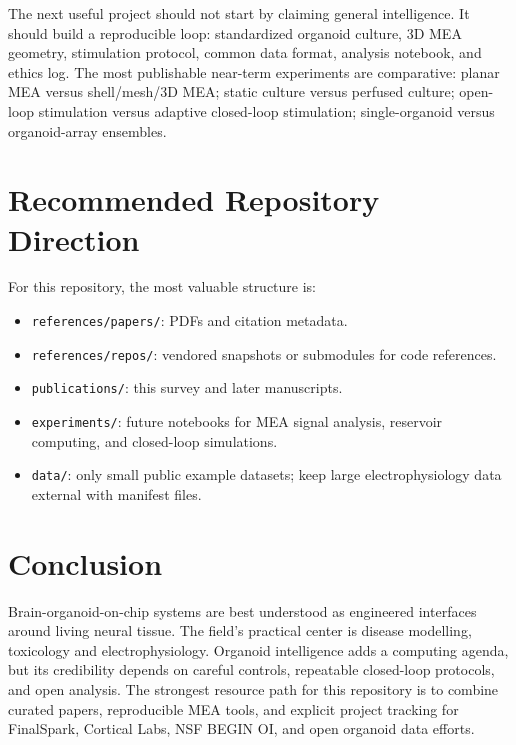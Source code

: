 \documentclass[10pt,twocolumn]{article}
\begin{document}
The next useful project should not start by claiming general intelligence. It should build a reproducible loop: standardized organoid culture, 3D MEA geometry, stimulation protocol, common data format, analysis notebook, and ethics log. The most publishable near-term experiments are comparative: planar MEA versus shell/mesh/3D MEA; static culture versus perfused culture; open-loop stimulation versus adaptive closed-loop stimulation; single-organoid versus organoid-array ensembles.

\section{Recommended Repository Direction}

For this repository, the most valuable structure is:
\begin{itemize}
\item \texttt{references/papers/}: PDFs and citation metadata.
\item \texttt{references/repos/}: vendored snapshots or submodules for code references.
\item \texttt{publications/}: this survey and later manuscripts.
\item \texttt{experiments/}: future notebooks for MEA signal analysis, reservoir computing, and closed-loop simulations.
\item \texttt{data/}: only small public example datasets; keep large electrophysiology data external with manifest files.
\end{itemize}

\section{Conclusion}

Brain-organoid-on-chip systems are best understood as engineered interfaces around living neural tissue. The field's practical center is disease modelling, toxicology and electrophysiology. Organoid intelligence adds a computing agenda, but its credibility depends on careful controls, repeatable closed-loop protocols, and open analysis. The strongest resource path for this repository is to combine curated papers, reproducible MEA tools, and explicit project tracking for FinalSpark, Cortical Labs, NSF BEGIN OI, and open organoid data efforts.
\end{document}
